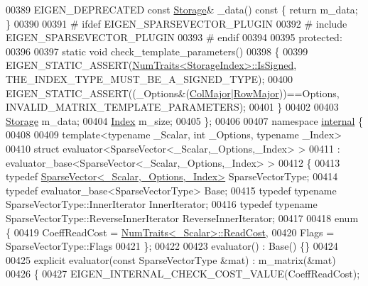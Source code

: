 \begin{DoxyCode}
00389     EIGEN\_DEPRECATED \textcolor{keyword}{const} \hyperlink{class_eigen_1_1internal_1_1_compressed_storage}{Storage}& \_data()\textcolor{keyword}{ const }\{ \textcolor{keywordflow}{return} m\_data; \}
00390     
00391 \textcolor{preprocessor}{#   ifdef EIGEN\_SPARSEVECTOR\_PLUGIN}
00392 \textcolor{preprocessor}{#     include EIGEN\_SPARSEVECTOR\_PLUGIN}
00393 \textcolor{preprocessor}{#   endif}
00394 
00395 \textcolor{keyword}{protected}:
00396   
00397     \textcolor{keyword}{static} \textcolor{keywordtype}{void} check\_template\_parameters()
00398     \{
00399       EIGEN\_STATIC\_ASSERT(\hyperlink{group___core___module_struct_eigen_1_1_num_traits}{NumTraits<StorageIndex>::IsSigned},
      THE\_INDEX\_TYPE\_MUST\_BE\_A\_SIGNED\_TYPE);
00400       EIGEN\_STATIC\_ASSERT((\_Options&(\hyperlink{group__enums_ggaacded1a18ae58b0f554751f6cdf9eb13a0cbd4bdd0abcfc0224c5fcb5e4f6669a}{ColMajor}|\hyperlink{group__enums_ggaacded1a18ae58b0f554751f6cdf9eb13acfcde9cd8677c5f7caf6bd603666aae3}{RowMajor}))==Options,
      INVALID\_MATRIX\_TEMPLATE\_PARAMETERS);
00401     \}
00402     
00403     \hyperlink{class_eigen_1_1internal_1_1_compressed_storage}{Storage} m\_data;
00404     \hyperlink{group___core___module_a554f30542cc2316add4b1ea0a492ff02}{Index} m\_size;
00405 \};
00406 
00407 \textcolor{keyword}{namespace }\hyperlink{namespaceinternal}{internal} \{
00408 
00409 \textcolor{keyword}{template}<\textcolor{keyword}{typename} \_Scalar, \textcolor{keywordtype}{int} \_Options, \textcolor{keyword}{typename} \_Index>
00410 \textcolor{keyword}{struct }evaluator<SparseVector<\_Scalar,\_Options,\_Index> >
00411   : evaluator\_base<SparseVector<\_Scalar,\_Options,\_Index> >
00412 \{
00413   \textcolor{keyword}{typedef} \hyperlink{group___sparse_core___module_class_eigen_1_1_sparse_vector}{SparseVector<\_Scalar,\_Options,\_Index>} SparseVectorType;
00414   \textcolor{keyword}{typedef} evaluator\_base<SparseVectorType> Base;
00415   \textcolor{keyword}{typedef} \textcolor{keyword}{typename} SparseVectorType::InnerIterator InnerIterator;
00416   \textcolor{keyword}{typedef} \textcolor{keyword}{typename} SparseVectorType::ReverseInnerIterator ReverseInnerIterator;
00417   
00418   \textcolor{keyword}{enum} \{
00419     CoeffReadCost = \hyperlink{group___core___module_struct_eigen_1_1_num_traits}{NumTraits<\_Scalar>::ReadCost},
00420     Flags = SparseVectorType::Flags
00421   \};
00422 
00423   evaluator() : Base() \{\}
00424   
00425   \textcolor{keyword}{explicit} evaluator(\textcolor{keyword}{const} SparseVectorType &mat) : m\_matrix(&mat)
00426   \{
00427     EIGEN\_INTERNAL\_CHECK\_COST\_VALUE(CoeffReadCost);

\end{DoxyCode}
